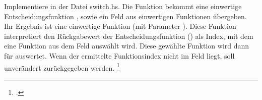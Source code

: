 \documentclass{bschlangaul-aufgabe}
\begin{document}

Implementiere in der Datei switch.hs. Die Funktion
 bekommt eine einwertige Entscheidungsfunktion
, sowie ein Feld aus einwertigen Funktionen übergeben.
Ihr Ergebnis ist eine einwertige Funktion (mit Parameter
). Diese Funktion interpretiert den Rückgabewert der
Entscheidungsfunktion () als Index, mit dem eine
Funktion aus dem Feld auswählt wird. Diese gewählte Funktion wird dann
für  auswertet. Wenn der ermittelte Funktionsindex
nicht im Feld liegt, soll  unverändert zurückgegeben
werden.
\footcite{fumup:ab:3}

\begin{bAntwort}
\end{bAntwort}
\end{document}
